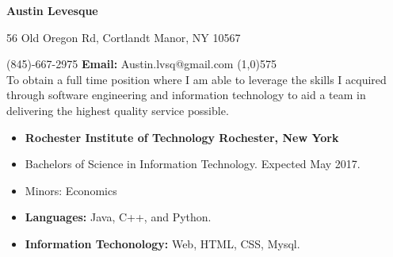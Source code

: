 \documentclass[10pt]{article}
\begin{document}
\centerline{\Large \bf Austin Levesque}
\vspace{.3ex}
\centerline{56 Old Oregon Rd, Cortlandt Manor, NY 10567}
\vspace{.5ex}
 (845)-667-2975 \hfill {\bf Email:} Austin.lvsq@gmail.com
\line(1,0){575}\\

To obtain a full time position where I am able to leverage the skills I acquired through software engineering and information technology to aid a team in delivering the highest quality service possible.
\vspace{1ex}\\
\begin{itemize}[topsep=1ex, itemsep=.25ex, partopsep=0ex, parsep=0ex]
	\item[]{{\bf Rochester Institute of Technology \hfill Rochester, New York}}
  \item[] Bachelors of Science in Information Technology. \hfill Expected May 2017.
  \item[] Minors: Economics
\end{itemize}
\vspace{1ex}
\begin{itemize} [topsep=.5ex, itemsep=.25ex, partopsep=0ex, parsep=.5ex]
	\item[] {\bf Languages:} Java, C++, and Python.
 	\item[] {\bf Information Techonology:} Web, HTML, CSS, Mysql.
\end{itemize}
\vspace{1ex}
\end{document}
